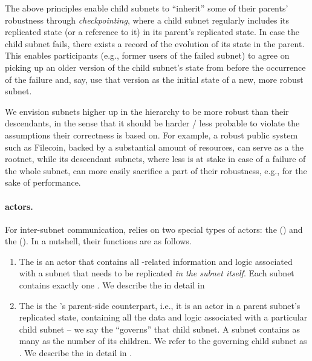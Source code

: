 The above principles enable child subnets to ``inherit'' some of their parents' robustness through \emph{checkpointing},
where a child subnet regularly includes its replicated state (or a reference to it) in its parent's replicated state.
In case the child subnet fails, there exists a record of the evolution of its state in the parent.
This enables participants (e.g., former users of the failed subnet) to agree on picking up an older version of the child subnet's state from before the occurrence of the failure
and, say, use that version as the initial state of a new, more robust subnet.

We envision subnets higher up in the hierarchy to be more robust than their descendants, in the sense that it should be harder / less probable to violate the assumptions their correctness is based on.
For example, a robust public system such as Filecoin, backed by a substantial amount of resources, can serve as a the rootnet,
while its descendant subnets, where less is at stake in case of a failure of the whole subnet, can more easily sacrifice a part of their robustness, e.g., for the sake of performance.


\paragraph{\ipc actors.}
For inter-subnet communication, \ipc relies on two special types of actors: the \gwFull (\gw) and the \saFull (\sa).
In a nutshell, their functions are as follows.
\begin{enumerate}
    \item The \gw is an actor that contains all \ipc-related information and logic associated with a subnet that needs to be replicated \emph{in the subnet itself}.
    Each subnet contains exactly one \gw. We describe the \gw in detail in 

    \item The \sa is the \gw's parent-side counterpart, i.e., it is an actor in a parent subnet's replicated state,
    containing all the data and logic associated with a particular child subnet -- we say the \sa ``governs'' that child subnet.
    A subnet contains as many \saFulls as the number of its children.
    We refer to the \sa governing child subnet  as .
    We describe the \sa in detail in .

\end{enumerate}

